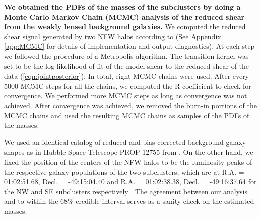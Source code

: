 
\textbf{We obtained the PDFs of the masses of the subclusters by doing a Monte
Carlo Markov Chain (MCMC) analysis of the reduced shear from the
weakly lensed background galaxies. } We computed the reduced shear signal
generated by two NFW halos according to \citet{Umetsu10} (See Appendix
\ref{app:MCMC} for
details of implementation and output diagnostics).
At each step we followed the procedure of a
Metropolis algorithm.  The transition kernel was set to
be the log likelihood of fit of the model shear to the reduced shear of the
data (\ref{eqn:jointposterior}).
In total, eight MCMC chains were used. After every 5000 MCMC steps for all
the chains, we computed the R coefficient \citep{Gelman92}  to
check for convergence. We performed more MCMC steps as long as convergence
was not achieved. After convergence was achieved, we removed the
burn-in portions of the MCMC chains and used the resulting MCMC chains as
samples of the PDFs of the masses. \par 
We used an identical catalog of reduced and bias-corrected background 
galaxy shapes as in Hubble Space Telescope PROP 12755 from . On the other hand, we fixed the
position of the centers of the NFW halos to be  the luminosity peaks of the
respective galaxy populations of  the two subclusters, which are at R.A. = 01:02:51.68, Decl. = -49:15:04.40 and R.A. = 01:02:38.38, Decl. = -49:16:37.64 for the NW and SE subclusters
respectively .  The agreement between our analysis and  to within
the 68\% credible interval serves as a sanity check on the estimated masses. 

